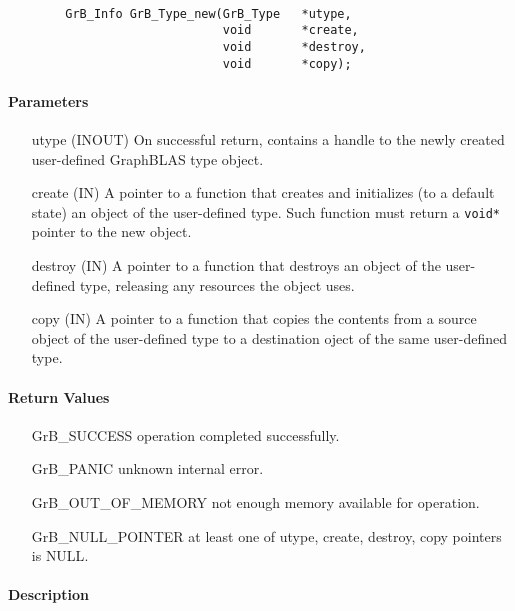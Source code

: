 \paragraph{\syntax}

\begin{verbatim}
        GrB_Info GrB_Type_new(GrB_Type   *utype,
                              void       *create,
                              void       *destroy,
                              void       *copy);
\end{verbatim}

\paragraph{Parameters}

\begin{itemize}[leftmargin=1.1in]
\item[{\sf utype}] ({\sf INOUT}) On successful return, contains a handle to the newly created user-defined GraphBLAS type object.
\item[{\sf create}] ({\sf IN})    A pointer to a function that creates and initializes (to a default state) an object of the user-defined type. Such function must return a {\tt void*} pointer to the new object.
\item[{\sf destroy}] ({\sf IN}) A pointer to a function that destroys an object of the user-defined type, releasing any resources the object uses.
\item[{\sf copy}] ({\sf IN}) A pointer to a function that copies the contents from a source object of the user-defined type to a destination oject of the same user-defined type.
\end{itemize}

\paragraph{Return Values}

\begin{itemize}[leftmargin=2.1in]
\item[{\sf GrB\_SUCCESS}]           operation completed successfully.
\item[{\sf GrB\_PANIC}]             unknown internal error.
\item[{\sf GrB\_OUT\_OF\_MEMORY}]          not enough memory available for operation.
\item[{\sf GrB\_NULL\_POINTER}]    at least one of {\sf utype}, {\sf create}, {\sf destroy}, {\sf copy} pointers is {\sf NULL}.
\end{itemize}

\paragraph{Description}
